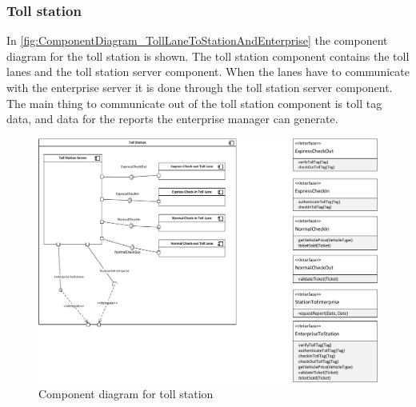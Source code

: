\subsubsection*{Toll station}
In \autoref{fig:ComponentDiagram_TollLaneToStationAndEnterprise} the component diagram for the toll station is shown. The toll station component contains the toll lanes and the toll station server component. When the lanes have to communicate with the enterprise server it is done through the toll station server component. The main thing to communicate out of the toll station component is toll tag data, and data for the reports the enterprise manager can generate.
\begin{figure}[H]
\centering
\includegraphics[width=1\textwidth]{img/component_diagrams/ComponentDiagram_TollLaneToStationAndEnterprise}
\caption{Component diagram for toll station}
\label{fig:ComponentDiagram_TollLaneToStationAndEnterprise}
\end{figure}

